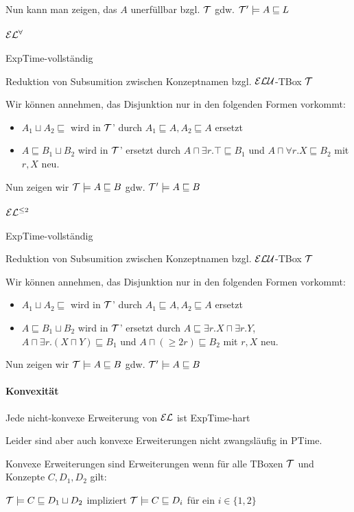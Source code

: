 Nun kann man zeigen, das $A$ unerfüllbar bzgl. $\mathcal{T}$ gdw. $\mathcal{T} ' \models A \sqsubseteq L$

\paragraph{$\mathcal{E}\mathcal{L}^{\forall}$}

ExpTime-vollständig

Reduktion von Subsumition zwischen Konzeptnamen bzgl. $\mathcal{E}\mathcal{L}\mathcal{U}$-TBox $\mathcal{T}$

Wir können annehmen, das Disjunktion nur in den folgenden Formen vorkommt:

\begin{itemize}
	\item $A_1 \sqcup A_2 \sqsubseteq$ wird in $\mathcal{T}$' durch $A_1 \sqsubseteq A, A_2 \sqsubseteq A$ ersetzt
	\item $A \sqsubseteq B_1 \sqcup B_2$ wird in $\mathcal{T}$' ersetzt durch $A \sqcap \exists r.\top \sqsubseteq B_1$ und $A \sqcap \forall r.X \sqsubseteq B_2$ mit $r,X$ neu.
\end{itemize}

Nun zeigen wir $\mathcal{T} \models A \sqsubseteq B$ gdw. $\mathcal{T}' \models A \sqsubseteq B$

\paragraph{$\mathcal{E}\mathcal{L}^{\leq 2}$}

ExpTime-vollständig

Reduktion von Subsumition zwischen Konzeptnamen bzgl. $\mathcal{E}\mathcal{L}\mathcal{U}$-TBox $\mathcal{T}$

Wir können annehmen, das Disjunktion nur in den folgenden Formen vorkommt:

\begin{itemize}
	\item $A_1 \sqcup A_2 \sqsubseteq$ wird in $\mathcal{T}$' durch $A_1 \sqsubseteq A, A_2 \sqsubseteq A$ ersetzt
	\item $A \sqsubseteq B_1 \sqcup B_2$ wird in $\mathcal{T}$' ersetzt durch $A \sqsubseteq \exists r.X \sqcap \exists r.Y$, $A \sqcap \exists r.(X \sqcap Y) \sqsubseteq B_1$ und $A \sqcap (\geq 2 r) \sqsubseteq B_2$ mit $r,X$ neu.
\end{itemize}

Nun zeigen wir $\mathcal{T} \models A \sqsubseteq B$ gdw. $\mathcal{T}' \models A \sqsubseteq B$

\paragraph{Konvexität}

Jede nicht-konvexe Erweiterung von $\mathcal{E}\mathcal{L}$ ist ExpTime-hart

Leider sind aber auch konvexe Erweiterungen nicht zwangsläufig in PTime.

Konvexe Erweiterungen sind Erweiterungen wenn für alle TBoxen $\mathcal{T}$ und Konzepte $C,D_1,D_2$ gilt:

$\mathcal{T} \models C \sqsubseteq D_1 \sqcup D_2$ impliziert $\mathcal{T} \models C \sqsubseteq D_i$ für ein $i \in \{1,2\}$